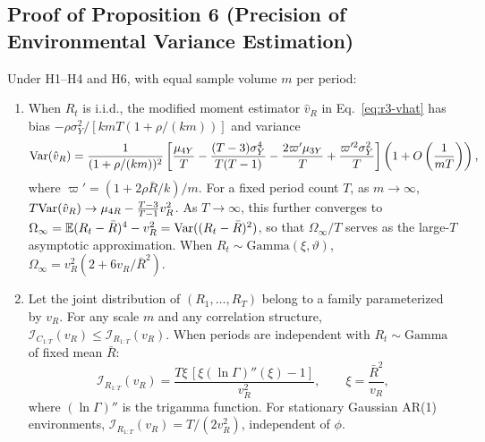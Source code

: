 \subsection{Proof of Proposition 6 (Precision of Environmental Variance Estimation)}
\label{sec:proof-prop6}

\begin{sproposition}
\label{sprop:vR-finite}
Under H1--H4 and H6, with equal sample volume $m$ per period:
\begin{enumerate}[label=(\alph*)]
  \item When $R_t$ is i.i.d., the modified moment estimator $\hat{v}_R$ in Eq.~\eqref{eq:r3-vhat} has bias $-\rho\sigma_Y^2/[kmT(1+\rho/(km))]$ and variance
  \begin{equation}
    \mathrm{Var}(\hat{v}_R) = \frac{1}{(1+\rho/(km))^2}\left[\frac{\mu_{4Y}}{T} - \frac{(T-3)\sigma_Y^4}{T(T-1)} - \frac{2\varpi'\mu_{3Y}}{T} + \frac{\varpi'^2\sigma_Y^2}{T}\right]\left(1 + O\left(\frac{1}{mT}\right)\right),
    \label{eq:r3-omega}
  \end{equation}
  where $\varpi' = (1 + 2\rho\bar{R}/k)/m$. For a fixed period count $T$, as $m \to \infty$, $T\mathrm{Var}(\hat{v}_R) \to \mu_{4R} - \frac{T-3}{T-1}v_R^2$. As $T \to \infty$, this further converges to $\Omega_\infty = \mathbb{E}(R_t-\bar{R})^4 - v_R^2 = \mathrm{Var}((R_t-\bar{R})^2)$, so that $\Omega_\infty/T$ serves as the large-$T$ asymptotic approximation. When $R_t \sim \text{Gamma}(\xi, \vartheta)$, $\Omega_\infty = v_R^2(2 + 6v_R/\bar{R}^2)$.
  \item Let the joint distribution of $(R_1, \dots, R_T)$ belong to a family parameterized by $v_R$. For any scale $m$ and any correlation structure, $\mathcal{I}_{C_{1:T}}(v_R) \le \mathcal{I}_{R_{1:T}}(v_R)$. When periods are independent with $R_t \sim \text{Gamma}$ of fixed mean $\bar{R}$:
  \begin{equation}
    \mathcal{I}_{R_{1:T}}(v_R) = \frac{T\xi\,[\xi(\ln\Gamma)''(\xi) - 1]}{v_R^2}, \qquad \xi = \frac{\bar{R}^2}{v_R},
    \label{eq:r3-IR}
  \end{equation}
  where $(\ln\Gamma)''$ is the trigamma function. For stationary Gaussian AR(1) environments, $\mathcal{I}_{R_{1:T}}(v_R) = T/(2v_R^2)$, independent of $\phi$.
\end{enumerate}
\end{sproposition}

